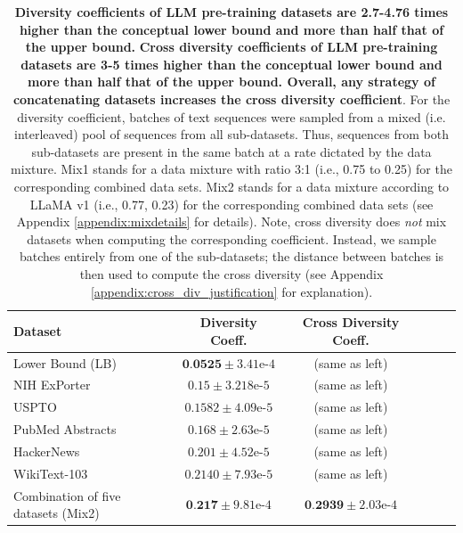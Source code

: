 \begin{table}[t]
\caption{\textbf{Diversity coefficients of LLM pre-training datasets are 2.7-4.76 times higher than the conceptual lower bound and more than half that of the upper bound.}
\textbf{Cross diversity coefficients of LLM pre-training datasets are 3-5 times higher than the conceptual lower bound and more than half that of the upper bound.
Overall, any strategy of concatenating datasets increases the cross diversity coefficient}.
For the diversity coefficient, batches of text sequences were sampled from a mixed (i.e. interleaved) pool of sequences from all sub-datasets. Thus, sequences from both sub-datasets are present in the same batch at a rate dictated by the data mixture.
Mix1 stands for a data mixture with ratio 3:1 (i.e., 0.75 to 0.25) for the corresponding combined data sets.
Mix2 stands for a data mixture according to LLaMA v1 (i.e., 0.77, 0.23) for the corresponding combined data sets (see Appendix \ref{appendix:mixdetails} for details).
Note, cross diversity does \textit{not} mix datasets when computing the corresponding coefficient. Instead, we sample batches entirely from one of the sub-datasets; the distance between batches is then used to compute the cross diversity (see Appendix \ref{appendix:cross_div_justification} for explanation).
}
\vskip 0.15in
\begin{center}
\begin{small}
\begin{sc}
\begin{tabular}{lccccr}
\toprule
Dataset & Diversity Coeff. & Cross Diversity Coeff. \\
\midrule
Lower Bound (LB) & $\textbf{0.0525}\pm 3.41\textrm{e-}4$ & (same as left) \\

NIH ExPorter & $0.15 \pm 3.218\textrm{e-}5$ & (same as left)\\
USPTO & $0.1582 \pm 4.09\textrm{e-}5$ & (same as left) \\
PubMed Abstracts & $0.168 \pm 2.63\textrm{e-}5$ & (same as left) \\
HackerNews & $0.201 \pm 4.52\textrm{e-}5$ & (same as left) \\

WikiText-103 & $0.2140 \pm 7.93\textrm{e-}5$ & (same as left) \\

Combination of five datasets (Mix2) & $ \textbf{0.217} \pm 9.81\textrm{e-}4$ & $\textbf{0.2939} \pm 2.03\textrm{e-}4$ \\


\end{tabular}
\end{sc}
\end{small}
\end{center}
\end{table}
